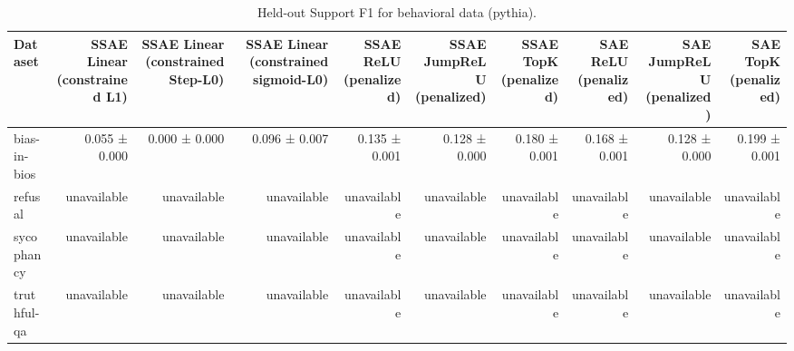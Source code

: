 \begin{table}[t]
\centering
\caption{Held-out Support F1 for behavioral data (pythia).}
\label{tab:behavioral-pythia-support-f1}
\begin{tabular}{lrrrrrrrrr}
\toprule
Dataset & SSAE Linear (constrained L1) & SSAE Linear (constrained Step-L0) & SSAE Linear (constrained sigmoid-L0) & SSAE ReLU (penalized) & SSAE JumpReLU (penalized) & SSAE TopK (penalized) & SAE ReLU (penalized) & SAE JumpReLU (penalized) & SAE TopK (penalized) \\
\midrule
bias-in-bios & 0.055 ± 0.000 & 0.000 ± 0.000 & 0.096 ± 0.007 & 0.135 ± 0.001 & 0.128 ± 0.000 & 0.180 ± 0.001 & 0.168 ± 0.001 & 0.128 ± 0.000 & 0.199 ± 0.001 \\
refusal & unavailable & unavailable & unavailable & unavailable & unavailable & unavailable & unavailable & unavailable & unavailable \\
sycophancy & unavailable & unavailable & unavailable & unavailable & unavailable & unavailable & unavailable & unavailable & unavailable \\
truthful-qa & unavailable & unavailable & unavailable & unavailable & unavailable & unavailable & unavailable & unavailable & unavailable \\
\bottomrule
\end{tabular}
\end{table}
